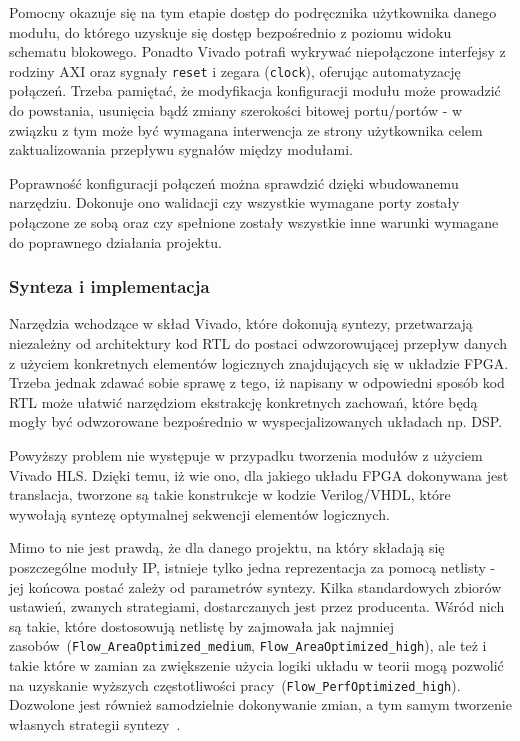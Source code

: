 Pomocny okazuje się na tym etapie dostęp do podręcznika użytkownika danego modułu, do którego uzyskuje się dostęp bezpośrednio z poziomu widoku schematu blokowego. Ponadto Vivado potrafi wykrywać niepołączone interfejsy z rodziny AXI oraz sygnały \texttt{reset} i zegara (\texttt{clock}), oferując automatyzację połączeń. Trzeba pamiętać, że modyfikacja konfiguracji modułu może prowadzić do powstania, usunięcia bądź zmiany szerokości bitowej portu/portów - w związku z tym może być wymagana interwencja ze strony użytkownika celem zaktualizowania przepływu sygnałów między modułami.

Poprawność konfiguracji połączeń można sprawdzić dzięki wbudowanemu narzędziu. Dokonuje ono walidacji czy wszystkie wymagane porty zostały połączone ze sobą oraz czy spełnione zostały wszystkie inne warunki wymagane do poprawnego działania projektu.

\begin{landscape}

\begin{center}
\end{center}

\end{landscape}

\subsubsection{Synteza i implementacja}
Narzędzia wchodzące w skład Vivado, które dokonują syntezy, przetwarzają niezależny od architektury kod RTL do postaci odwzorowującej przepływ danych z użyciem konkretnych elementów logicznych znajdujących się w układzie FPGA. Trzeba jednak zdawać sobie sprawę z tego, iż napisany w odpowiedni sposób kod RTL może ułatwić narzędziom ekstrakcję konkretnych zachowań, które będą mogły być odwzorowane bezpośrednio w wyspecjalizowanych układach np. DSP. 

Powyższy problem nie występuje w przypadku tworzenia modułów z użyciem Vivado HLS. Dzięki temu, iż wie ono, dla jakiego układu FPGA dokonywana jest translacja, tworzone są takie konstrukcje w kodzie Verilog/VHDL, które wywołają syntezę optymalnej sekwencji elementów logicznych. 

Mimo to nie jest prawdą, że dla danego projektu, na który składają się poszczególne moduły IP, istnieje tylko jedna reprezentacja za pomocą netlisty - jej końcowa postać zależy od parametrów syntezy. Kilka standardowych zbiorów ustawień, zwanych strategiami, dostarczanych jest przez producenta. Wśród nich są takie, które dostosowują netlistę by zajmowała jak najmniej zasobów~(\texttt{Flow\_AreaOptimized\_medium}, \texttt{Flow\_AreaOptimized\_high}), ale też i takie które w zamian za zwiększenie użycia logiki układu w teorii mogą pozwolić na uzyskanie wyższych częstotliwości pracy~(\texttt{Flow\_PerfOptimized\_high}). Dozwolone jest również samodzielnie dokonywanie zmian, a tym samym tworzenie własnych strategii syntezy~\cite{UG901}. 

